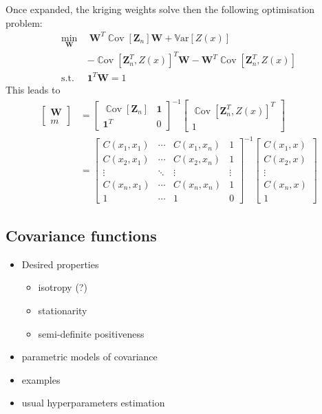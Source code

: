 \documentclass[a4paper,11pt]{article}
\newcommand{\Var}{\mathbb{V}\text{ar}}
\DeclareMathOperator{\Cov}{\mathbb{C}\text{ov}}
\theoremstyle{defi}
\numberwithin{thmCounter}{section}
\begin{document}
Once expanded, the kriging weights solve then the following optimisation problem:
\begin{align}
  \min_{\mathbf{W}} ~&~\mathbf{W}^T \Cov\left[\mathbf{Z}_n\right] \mathbf{W}+ \Var\left[Z(x)\right] \\ &-\Cov\left[\mathbf{Z}_n^T, Z(x) \right]^T \mathbf{W}- \mathbf{W}^T\Cov\left[\mathbf{Z}_n^T, Z(x) \right] \\ 
  \text{s.t. }&  \mathbf{1}^T\mathbf{W} = 1
\end{align}
This leads to
\begin{align}
  \begin{bmatrix}
    \mathbf{W} \\ m
  \end{bmatrix}
  &=
  \begin{bmatrix}
    \Cov\left[\mathbf{Z}_n\right] & \mathbf{1} \\
  \mathbf{1}^T & 0
\end{bmatrix}^{-1}
                 \begin{bmatrix}
                  \Cov\left[\mathbf{Z}_n^T, Z(x) \right]^T \\ 1 
\end{bmatrix}
  \\ &=
    \begin{bmatrix}
      C(x_1, x_1) & \cdots & C(x_1, x_n) & 1 \\
      C(x_2, x_1) & \cdots & C(x_2, x_n) & 1 \\
      \vdots & \ddots & \vdots & \vdots \\
      C(x_n, x_1) & \cdots & C(x_n, x_n)& 1 \\
      1 & \cdots & 1 & 0
    \end{bmatrix}^{-1}
                       \begin{bmatrix}
                         C(x_1, x) \\
                         C(x_2, x) \\
                         \vdots \\
                         C(x_n, x) \\
                         1
                       \end{bmatrix}
\end{align}

\subsection{Covariance functions}
\label{sec:cov_fun}
\begin{itemize}
\item Desired properties
  \begin{itemize}
  \item isotropy (?)
  \item stationarity
  \item semi-definite positiveness
  \end{itemize}
\item parametric models of covariance
\item examples
\item usual hyperparameters estimation
\end{itemize}
\end{document}
